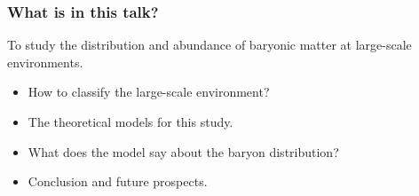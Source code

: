 \documentclass[aspectratio=43]{beamer}
\begin{document}
\begin{frame}
  \frametitle{What is in this talk?}
  To study the distribution and abundance of baryonic matter at large-scale environments.
  \begin{itemize}
    \item<1-> How to classify the large-scale environment?
    \item<2-> The theoretical models for this study.
    \item<3-> What does the model say about the baryon distribution?
    \item<4-> Conclusion and future prospects.
  \end{itemize}
\end{frame}
\end{document}
